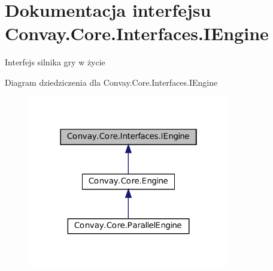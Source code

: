 \hypertarget{interface_convay_1_1_core_1_1_interfaces_1_1_i_engine}{}\section{Dokumentacja interfejsu Convay.\+Core.\+Interfaces.\+I\+Engine}
\label{interface_convay_1_1_core_1_1_interfaces_1_1_i_engine}


Interfejs silnika gry w życie  




Diagram dziedziczenia dla Convay.\+Core.\+Interfaces.\+I\+Engine
\nopagebreak
\begin{figure}[H]
\begin{center}
\leavevmode
\includegraphics[width=250pt]{interface_convay_1_1_core_1_1_interfaces_1_1_i_engine__inherit__graph}
\end{center}
\end{figure}
